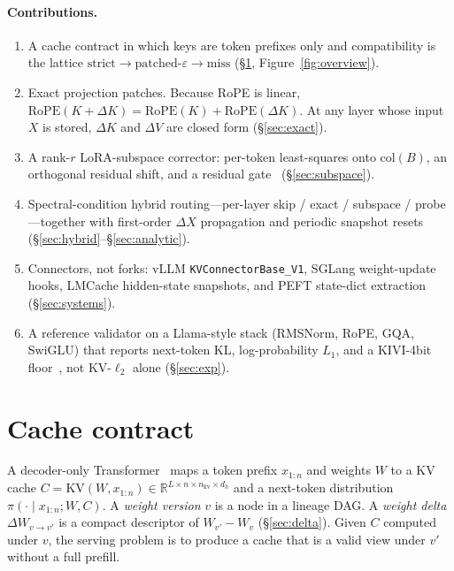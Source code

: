 \documentclass{article}
\begin{document}
\paragraph{Contributions.}
\begin{enumerate}[leftmargin=1.4em,itemsep=2pt]
\item A cache contract in which keys are token prefixes only and
compatibility is the lattice
$\mathrm{strict}\to\mathrm{patched}\text{-}\varepsilon\to\mathrm{miss}$
(\S\ref{sec:contract}, Figure~\ref{fig:overview}).
\item Exact projection patches.
Because RoPE is linear,
$\mathrm{RoPE}(K+\Delta K)=\mathrm{RoPE}(K)+\mathrm{RoPE}(\Delta K)$.
At any layer whose input $X$ is stored, $\Delta K$ and $\Delta V$ are
closed form (\S\ref{sec:exact}).
\item A rank-$r$ LoRA-subspace corrector: per-token least-squares onto
$\mathrm{col}(B)$, an orthogonal residual shift, and a residual
gate~\citep{yao2024cacheblend} (\S\ref{sec:subspace}).
\item Spectral-condition hybrid routing---per-layer skip / exact /
subspace / probe---together with first-order $\Delta X$ propagation and
periodic snapshot resets (\S\ref{sec:hybrid}--\S\ref{sec:analytic}).
\item Connectors, not forks: vLLM \texttt{KVConnectorBase\_V1}, SGLang
weight-update hooks, LMCache hidden-state snapshots, and PEFT
state-dict extraction (\S\ref{sec:systems}).
\item A reference validator on a Llama-style stack (RMSNorm, RoPE, GQA,
SwiGLU) that reports next-token KL, log-probability $L_1$, and a
KIVI-4bit floor~\citep{liu2024kivi}, not KV-$\ell_2$ alone
(\S\ref{sec:exp}).
\end{enumerate}

\section{Cache contract}
\label{sec:contract}

A decoder-only Transformer~\citep{touvron2023llama} maps a token prefix
$x_{1:n}$ and weights $W$ to a KV cache
$C=\mathrm{KV}(W,x_{1:n})\in\mathbb{R}^{L\times n\times n_{\mathrm{kv}}\times d_h}$
and a next-token distribution $\pi(\cdot\mid x_{1:n};W,C)$.
A \emph{weight version} $v$ is a node in a lineage DAG.
A \emph{weight delta} $\Delta W_{v\to v'}$ is a compact descriptor of
$W_{v'}-W_v$ (\S\ref{sec:delta}).
Given $C$ computed under $v$, the serving problem is to produce a cache
that is a valid view under $v'$ without a full prefill.
\end{document}
